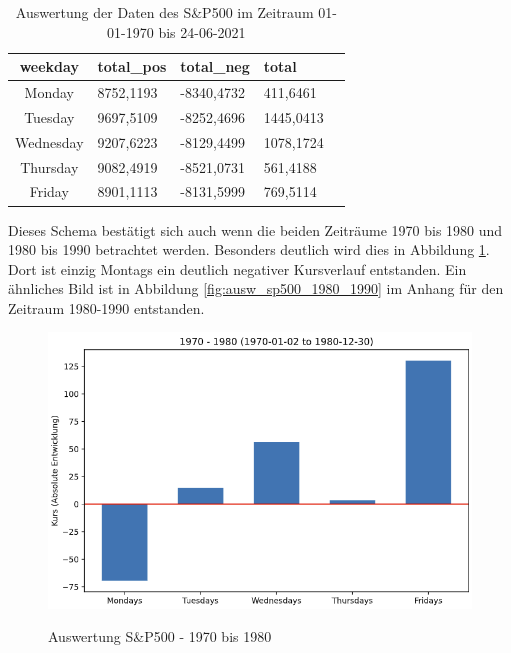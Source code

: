 \begin{table}[hbt]
    \centering
    \begin{minipage}[t]{1\textwidth} %
        \caption{Auswertung der Daten des S\&P500 im Zeitraum 01-01-1970 bis 24-06-2021} %
        \begin{tabularx}{\columnwidth}{ |c|X|X|X|X| }
            \hline
            \textbf{weekday} & \textbf{total\_pos} & \textbf{total\_neg} & \textbf{total} \\ \hline
            Monday           & 8752,1193           & -8340,4732          & 411,6461       \\ \hline
            Tuesday          & 9697,5109           & -8252,4696          & 1445,0413      \\ \hline
            Wednesday        & 9207,6223           & -8129,4499          & 1078,1724      \\ \hline
            Thursday         & 9082,4919           & -8521,0731          & 561,4188       \\ \hline
            Friday           & 8901,1113           & -8131,5999          & 769,5114       \\ \hline
        \end{tabularx}
        \label{tab:ausw_sp500}
    \end{minipage}
\end{table}

Dieses Schema bestätigt sich auch wenn die beiden Zeiträume 1970 bis 1980 und 1980 bis 1990 betrachtet werden. Besonders deutlich wird dies in Abbildung \ref{fig:ausw_sp500_1970_1980}. Dort ist einzig Montags ein deutlich negativer Kursverlauf entstanden. Ein ähnliches Bild ist in Abbildung \ref{fig:ausw_sp500_1980_1990} im Anhang für den Zeitraum 1980-1990 entstanden.

\begin{figure}[!htb]
    \centering
    \begin{minipage}[t]{0.8\textwidth}
        \caption{Auswertung S\&P500 - 1970 bis 1980}
        \includegraphics[width=1\textwidth]{img/Auswertung_SP500_1970-1980.PNG}\\
        \label{fig:ausw_sp500_1970_1980}
    \end{minipage}
\end{figure}

\clearpage